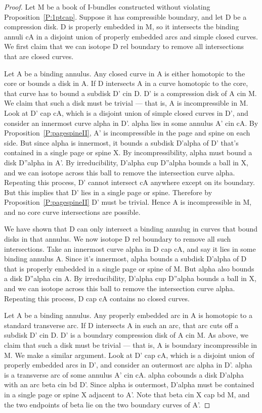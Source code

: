 \begin{proof}

Let M be a book of I-bundles constructed without violating
Proposition~\ref{P:1ptcap}. Suppose it has compressible boundary, and let D be
a compression disk. D is properly embedded in M, so it intersects the binding
annuli cA in a disjoint union of properly embedded arcs and simple closed
curves.  We first claim that we can isotope D rel boundary to remove all
intersections that are closed curves.

Let A be a binding annulus. Any closed curve in A is either homotopic to the
core or bounds a disk in A. If D intersects A in a curve homotopic to the core,
that curve has to bound a subdisk D' cin D. D' is a compression disk of A cin
M. We claim that such a disk must be trivial --- that is, A is incompressible
in M.  Look at D' cap cA, which is a disjoint union of simple closed curves in
D', and consider an innermost curve alpha in D'.  alpha lies in some annulus A'
cin cA.  By Proposition~\ref{P:pagespineII}, A' is incompressible in the page
and spine on each side. But since alpha is innermost, it bounds a subdisk
D'alpha of D' that's contained in a single page or spine X. By
incompressibility, alpha must bound a disk D''alpha in A'. By irreducibility,
D'alpha cup D''alpha bounds a ball in X, and we can isotope across this ball to
remove the intersection curve alpha. Repeating this process, D' cannot
intersect cA anywhere except on its boundary. But this implies that D' lies in
a single page or spine. Therefore by Proposition~\ref{P:pagespineII} D' must be
trivial.  Hence A is incompressible in M, and no core curve intersections are
possible.

We have shown that D can only intersect a binding annulug in curves that bound
disks in that annulus.  We now isotope D rel boundary to remove all such
intersections.  Take an innermost curve alpha in D cap cA, and say it lies in
some binding annulus A. Since it's innermost, alpha bounds a subdisk D'alpha of
D that is properly embedded in a single page or spine of M. But alpha also
bounds a disk D''alpha cin A. By irreducibility, D'alpha cup D''alpha bounds
a ball in X, and we can isotope across this ball to remove the intersection
curve alpha. Repeating this process, D cap cA contains no closed curves.

Let A be a binding annulus. Any properly embedded arc in A is homotopic to
a standard transverse arc. If D intersects A in such an arc, that arc cuts off
a subdisk D' cin D. D' is a boundary compression disk of A cin M. As above, we
claim that such a disk must be trivial --- that is, A is boundary
incompressible in M.  We make a similar argument. Look at D' cap cA, which is
a disjoint union of properly embedded arcs in D', and consider an outermost arc
alpha in D'.  alpha is a transverse arc of some annulus A' cin cA. alpha
cobounds a disk D'alpha with an arc beta cin bd D'. Since alpha is outermost,
D'alpha must be contained in a single page or spine X adjacent to A'. Note that
beta cin X cap bd M, and the two endpoints of beta lie on the two boundary
curves of A'.


\end{proof}

